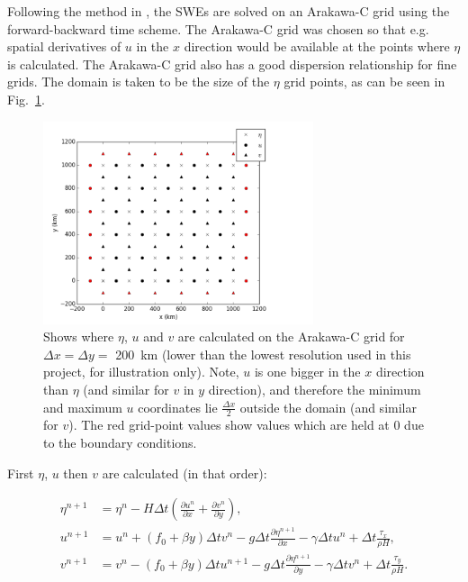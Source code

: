 \documentclass{article}
\begin{document}
Following the method in \textcite{beckers1993stability}, the SWEs are solved on an Arakawa-C grid
using the forward-backward time scheme. The Arakawa-C grid was chosen so that e.g. spatial
derivatives of $u$ in the $x$ direction would be available at the points where $\eta$ is calculated.
The Arakawa-C grid also has a good dispersion relationship for fine grids. The domain is taken to be
the size of the $\eta$ grid points, as can be seen in Fig.\ \ref{fig:arakawa_c_grid}.

\begin{figure}[ht!]
    \centering
    \includegraphics[width=300px]{figures/arakawa_c_grid}
    \caption{Shows where $\eta$, $u$ and $v$ are calculated on the Arakawa-C grid for $\Delta x =
	\Delta y =$ \SI{200}{km} (lower than the lowest resolution used in this project, for
	illustration only). Note, $u$ is one bigger in the $x$ direction than $\eta$ (and similar
	for $v$ in $y$ direction), and therefore the minimum and maximum $u$ coordinates lie
	$\frac{\Delta x}{2}$ outside the domain (and similar for $v$). The red grid-point values
	show values which are held at $0$ due to the boundary conditions. }
    \label{fig:arakawa_c_grid}
\end{figure}

First $\eta$, $u$ then $v$ are calculated (in that order):

\begin{align}
    \label{eqn:swe_arakawa1} 
    \eta^{n+1} & =  \eta^n- H \Delta t (\frac{\partial u^n}{\partial x} + \frac{\partial v^n}{\partial y} ),  \\
    \label{eqn:swe_arakawa2} 
    u^{n+1} & = u^n + (f_0 + \beta y) \Delta t v^n - g \Delta t \frac{\partial \eta^{n+1}}{\partial
    x} - \gamma \Delta t u^n + \Delta t \frac{\tau_x}{\rho H}, \\
    \label{eqn:swe_arakawa3} 
    v^{n+1} & = v^n - (f_0 + \beta y) \Delta t u^{n+1} - g \Delta t \frac{\partial \eta^{n+1}}{\partial y} -
    \gamma \Delta t v^n + \Delta t \frac{\tau_y}{\rho H}.
\end{align}
\end{document}

